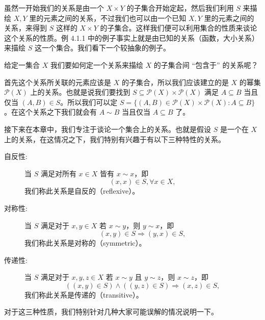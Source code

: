 
虽然一开始我们的关系是由一个 $X \times Y$ 的子集合开始定起，然后我们利用 $S$ 来描绘 $X, Y$ 里的元素之间的关系，不过我们也可以由一个已知 $X, Y$ 里的元素之间的关系，来得到 $S$ 这样的 $X \times Y$ 的子集合。这样我们便可以利用集合的性质来谈论这个关系的性质。例 4.1.1 中的例子事实上就是由已知的关系（函数，大小关系）来描绘 $S$ 这一个集合。我们看下一个较抽象的例子。

\begin{example}
给定一集合 $X$ 我们要如何定一个关系来描绘 $X$ 的子集合间 “包含于” 的关系呢？

首先这个关系所关联的元素应该是 $X$ 的子集合，所以我们应该建立的是 $X$ 的幂集 $\mathcal{P}(X)$ 上的关系。也就是说我们要找到 $S \subseteq \mathcal{P}(X) \times \mathcal{P}(X)$ 满足 $A \subseteq B$ 当且仅当 $(A, B) \in S$。所以我们可以定 $S = \{(A, B) \in \mathcal{P}(X) \times \mathcal{P}(X) : A \subseteq B\}$。在这个关系之下我们就会有 $A \sim B$ 当且仅当 $A \subseteq B$ 了。
\end{example}

接下来在本章中，我们专注于谈论一个集合上的关系。也就是假设 $S$ 是一个在 $X$ 上的关系，在这情况之下，我们特别有兴趣于有以下三种特性的关系。

\begin{description}
    \item[自反性:] 当 $S$ 满足对所有 $x \in X$ 皆有 $x \sim x$，即
    $$ (x, x) \in S, \forall x \in X, $$
    我们称此关系是自反的（reflexive）。
    \item[对称性:] 当 $S$ 满足对于 $x, y \in X$ 若 $x \sim y$，则 $y \sim x$，即
    $$ (x, y) \in S \Rightarrow (y, x) \in S, $$
    我们称此关系是对称的（symmetric）。
    \item[传递性:] 当 $S$ 满足对于 $x, y, z \in X$ 若 $x \sim y$ 且 $y \sim z$，则 $x \sim z$，即
    $$ ((x, y) \in S) \wedge ((y, z) \in S) \Rightarrow (x, z) \in S, $$
    我们称此关系是传递的（transitive）。
\end{description}

对于这三种性质，我们特别针对几种大家可能误解的情况说明一下。

